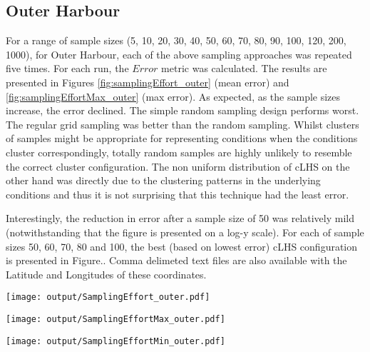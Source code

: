 \documentclass[a4paper]{article}
\let\origfigure=\figure
\let\endorigfigure=\endfigure
\renewenvironment{figure}[1][]{%
   \origfigure[H]
}{%
   \endorigfigure
}
\begin{document}
\hypertarget{outer-harbour}{%
\subsection{Outer Harbour}\label{outer-harbour}}

For a range of sample sizes (5, 10, 20, 30, 40, 50, 60, 70, 80, 90, 100,
120, 200, 1000), for Outer Harbour, each of the above sampling
approaches was repeated five times. For each run, the \(Error\) metric
was calculated. The results are presented in Figures
\ref{fig:samplingEffort_outer} (mean error) and
\ref{fig:samplingEffortMax_outer} (max error). As expected, as the
sample sizes increase, the error declined. The simple random sampling
design performs worst. The regular grid sampling was better than the
random sampling. Whilst clusters of samples might be appropriate for
representing conditions when the conditions cluster correspondingly,
totally random samples are highly unlikely to resemble the correct
cluster configuration. The non uniform distribution of cLHS on the other
hand was directly due to the clustering patterns in the underlying
conditions and thus it is not surprising that this technique had the
least error.

Interestingly, the reduction in error after a sample size of 50 was
relatively mild (notwithstanding that the figure is presented on a log-y
scale). For each of sample sizes 50, 60, 70, 80 and 100, the best (based
on lowest error) cLHS configuration is presented in Figure.. Comma
delimeted text files are also available with the Latitude and Longitudes
of these coordinates.

\begin{figure}
\centering\scriptsize
\texttt{[image: output/SamplingEffort\_outer.pdf]}
\caption{Comparison of the mean Error conditional on sample size and
sampling method for the Outer Harbour\label{fig:samplingEffort_outer}}
\end{figure}

\begin{figure}
\centering\scriptsize
\texttt{[image: output/SamplingEffortMax\_outer.pdf]}
\caption{Comparison of the maximum Error conditional on sample size and
sampling method for the Outer
Harbour\label{fig:samplingEffortMax_outer}}
\end{figure}

\begin{figure}
\centering\scriptsize
\texttt{[image: output/SamplingEffortMin\_outer.pdf]}
\caption{Comparison of the minimum Error conditional on sample size and
sampling method for the Outer
Harbour\label{fig:samplingEffortMin_outer}}
\end{figure}
\end{document}
